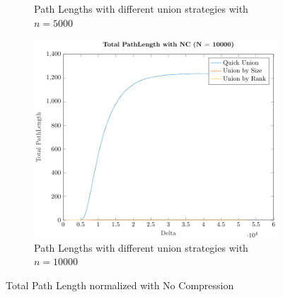 \begin{figure}[ht]
\begin{subfigure}{0.32\textwidth}
        \caption{Path Lengths with different union strategies with $n = 5000$}
    \end{subfigure}%
    \hfill
    \begin{subfigure}{0.32\textwidth}
        \centering
        \includegraphics[width=\textwidth]{../images/plotNCFull10000_PathLength.pdf}
        \caption{Path Lengths with different union strategies with $n = 10000$}
    \end{subfigure}

    \caption{Total Path Length normalized with No Compression}
    \label{fig:tplNC}
\end{figure}

